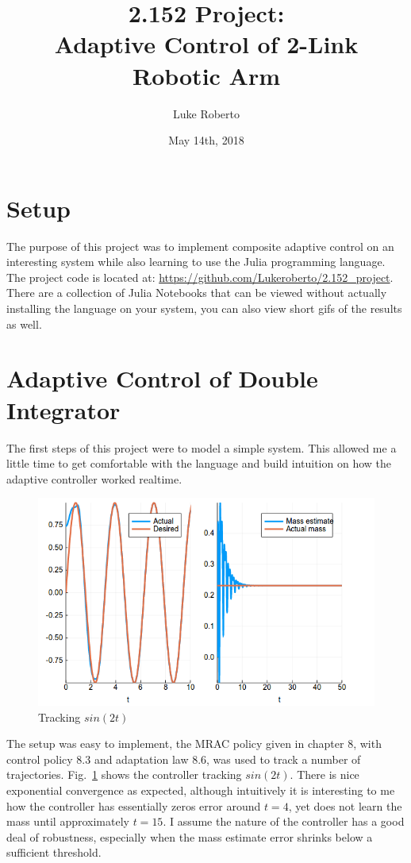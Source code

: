 \documentclass[12pt]{article}
\title{\Large \bf 2.152 Project: \\ Adaptive Control of 2-Link Robotic Arm}
\author{\vspace{-6em}Luke Roberto}
\date{\vspace{-6em}May 14th, 2018}
\begin{document}
\vspace{-2em}

\section{Setup}

The purpose of this project was to implement composite adaptive control on an interesting system while also learning to use the Julia programming language. The project code is located at: \url{https://github.com/Lukeroberto/2.152_project}. There are a collection of Julia Notebooks that can be viewed without actually installing the language on your system, you can also view short gifs of the results as well.
\\

\section{Adaptive Control of Double Integrator}

The first steps of this project were to model a simple system. This allowed me a little time to get comfortable with the language and build intuition on how the adaptive controller worked realtime.
\\

\begin{figure}[h]
    \centering
    \includegraphics[width=3.5in\textsize]{double_integrator_adaptation.png}
    \caption{Tracking $sin(2t)$}
    \label{fig:double_integrator_sine}
\end{figure}

\noindent
The setup was easy to implement, the MRAC policy given in chapter 8, with control policy 8.3 and adaptation law 8.6, was used to track a number of trajectories. Fig.~\ref{fig:double_integrator_sine} shows the controller tracking $sin(2t)$. There is nice exponential convergence as expected, although intuitively it is interesting to me how the controller has essentially zeros error around $t=4$, yet does not learn the mass until approximately $t=15$. I assume the nature of the controller has a good deal of robustness, especially when the mass estimate error shrinks below a sufficient threshold.
\\
\end{document}
